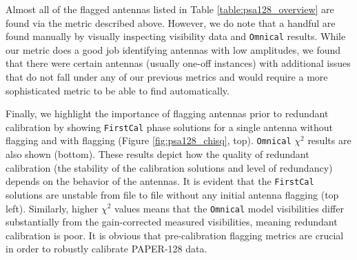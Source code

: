 Almost all of the flagged antennas listed in Table \ref{table:psa128_overview} are found via the metric described above. However, we do note that a handful are found manually by visually inspecting visibility data and {\tt Omnical} results. While our metric does a good job identifying antennas with low amplitudes, we found that there were certain antennas (usually one-off instances) with additional issues that do not fall under any of our previous metrics and would require a more sophisticated metric to be able to find automatically.

Finally, we highlight the importance of flagging antennas prior to redundant calibration by showing {\tt FirstCal} phase solutions for a single antenna without flagging and with flagging (Figure \ref{fig:psa128_chisq}, top). {\tt Omnical} $\chi^{2}$ results are also shown (bottom). These results depict how the quality of redundant calibration (the stability of the calibration solutions and level of redundancy) depends on the behavior of the antennas. It is evident that the {\tt FirstCal} solutions are unstable from file to file without any initial antenna flagging (top left). Similarly, higher $\chi^{2}$ values means that the {\tt Omnical} model visibilities differ substantially from the gain-corrected measured visibilities, meaning redundant calibration is poor. It is obvious that pre-calibration flagging metrics are crucial in order to robustly calibrate PAPER-128 data.

